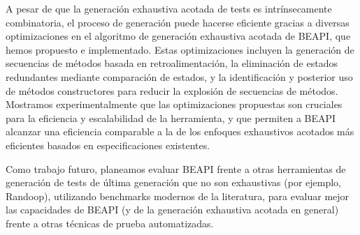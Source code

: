 A pesar de que la generación exhaustiva acotada de tests es intrínsecamente combinatoria, 
el proceso de generación puede hacerse eficiente gracias a diversas optimizaciones en el algoritmo de generación exhaustiva acotada de BEAPI, que hemos propuesto e implementado. 
Estas optimizaciones incluyen la generación de secuencias de métodos basada en retroalimentación, la eliminación de estados redundantes mediante comparación de estados, y la identificación y posterior uso de métodos constructores para reducir la explosión de secuencias de métodos. 
Mostramos experimentalmente que las optimizaciones propuestas son cruciales para la eficiencia y escalabilidad de la herramienta, y que permiten a BEAPI alcanzar una eficiencia comparable a la de los enfoques exhaustivos acotados más eficientes basados en especificaciones existentes.

Como trabajo futuro, planeamos evaluar BEAPI frente a otras herramientas de generación de tests de última generación que no son exhaustivas (por ejemplo, Randoop), 
utilizando benchmarks modernos de la literatura, para evaluar mejor las capacidades de BEAPI (y de la generación exhaustiva acotada en general) 
frente a otras técnicas de prueba automatizadas.




